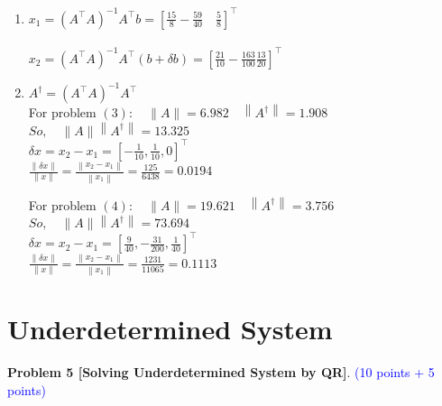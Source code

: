 \documentclass[english,onecolumn]{IEEEtran}
\begin{document}
\begin{enumerate}
\item
$x_{1}=\left(A^{\top} A\right)^{-1} A^{\top} b=\left[\frac{15}{8}-\frac{59}{40} \quad \frac{5}{8}\right]^{\top}$\\\\
$x_{2}=\left(A^{\top} A\right)^{-1} A^{\top}(b+\delta b)=\left[\frac{21}{10}-\frac{163}{100} \frac{13}{20}\right]^{\top}$\\

\item
$A^{\dagger}=\left(A^{\top} A\right)^{-1} A^{\top}$\\
For problem $(3): \quad\|A\|=6.982 \quad\left\|A^{\dagger}\right\|=1.908$\\
$So, \quad\|A\|\left\|A^{\dagger}\right\|=13.325$\\
$\delta x=x_{2}-x_{1}=\left[-\frac{1}{10}, \frac{1}{10}, 0\right]^{\top}$\\
$\frac{\|\delta x\|}{\|x\|}=\frac{\left\|x_{2}-x_{1}\right\|}{\left\|x_{1}\right\|}=\frac{125}{6438}=0.0194$




For problem $(4): \quad\|A\|=19.621 \quad\left\|A^{\dagger}\right\|=3.756$\\
$So, \quad\|A\|\left\|A^{\dagger}\right\|=73.694$\\
$\delta x=x_{2}-x_{1}=\left[\frac{9}{40},-\frac{31}{200}, \frac{1}{40}\right]^{\top}$\\
$\frac{\|\delta x\|}{\|x\|}=\frac{\left\|x_{2}-x_{1}\right\|}{\left\|x_{1}\right\|}=\frac{1231}{11065}=0.1113$

\end{enumerate}


\newpage
\section{Underdetermined System}

\noindent\textbf{Problem 5 [Solving Underdetermined System by QR]}. \textcolor{blue}{(10 points + 5 points)}
\end{document}
